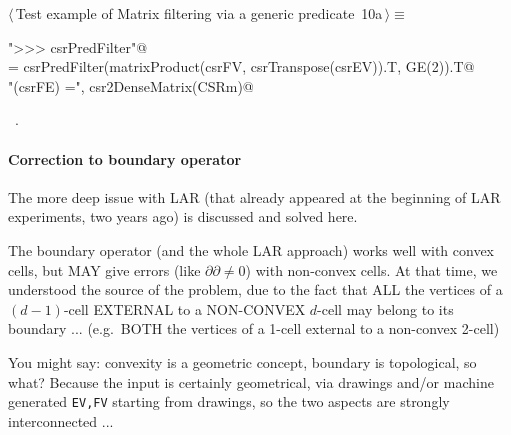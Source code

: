 \documentclass[11pt,oneside]{article}	%
\begin{document}
\begin{flushleft} \small \label{scrap17}
\protect{}$\langle\,$Test example of Matrix filtering via a generic predicate\nobreak\ {\footnotesize 10a}$\,\rangle\equiv$
\vspace{-1ex}
\begin{list}{}{} \item
\mbox{}\verb@print "\n>>> csrPredFilter"@\\
\mbox{}\verb@CSRm = csrPredFilter(matrixProduct(csrFV, csrTranspose(csrEV)).T, GE(2)).T@\\
\mbox{}\verb@print "\nccsrPredFilter(csrFE) =\n", csr2DenseMatrix(CSRm)@\\
\mbox{}\verb@@{\NWsep}
\end{list}
\vspace{-1ex}
\footnotesize\addtolength{\baselineskip}{-1ex}
\begin{list}{}{\setlength{\itemsep}{-\parsep}\setlength{\itemindent}{-\leftmargin}}
\item \NWtxtMacroRefIn\ .
\end{list}
\end{flushleft}

\paragraph{Correction to boundary operator}
The more deep issue with LAR (that already appeared at the beginning of LAR experiments, two years ago) is discussed and solved here.

The boundary operator (and the whole LAR approach) works well with convex cells, but MAY give errors (like $\partial\partial \not= 0$) with non-convex cells. At that time, we understood the source of the problem, due to the fact that ALL the vertices of a $(d-1)$-cell  EXTERNAL to a NON-CONVEX $d$-cell may belong to its boundary ... (e.g.~BOTH the vertices of a 1-cell external to a non-convex 2-cell)

You might say: convexity is a geometric concept, boundary is topological, so what? 
Because the input is certainly geometrical, via drawings and/or machine generated \texttt{EV,FV} starting from drawings, so the two aspects are strongly interconnected ... 
\end{document}
